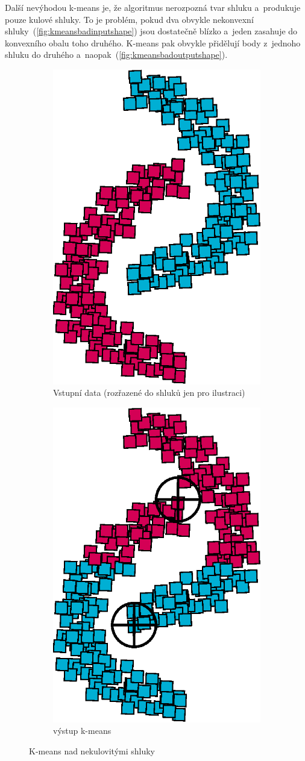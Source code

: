 Další nevýhodou k-means je, že algoritmus nerozpozná tvar shluku a~produkuje pouze kulové shluky. To je problém, pokud dva obvykle nekonvexní shluky~(\autoref{fig:kmeansbadinputshape}) jsou dostatečně blízko a~jeden zasahuje do konvexního obalu toho druhého. K-means pak obvykle přidělují body z~jednoho shluku do druhého a~naopak~(\autoref{fig:kmeansbadoutputshape}).\\
\begin{figure}[h]
\begin{subfigure}{.49\textwidth}
  \centering
  \includegraphics[width=.5\linewidth]{img/kmeans_badInputSampleShape.eps}
  \caption{Vstupní data (rozřazené do shluků jen pro ilustraci)}
  \label{fig:kmeansbadinputshape}
\end{subfigure}
\begin{subfigure}{.49\textwidth}
  \centering
  \includegraphics[width=.5\linewidth]{img/kmeans_badOutputSampleShape.eps}
  \caption{výstup k-means}
  \label{fig:kmeansbadoutputshape}
\end{subfigure}
\caption{K-means nad nekulovitými shluky}
\end{figure}

